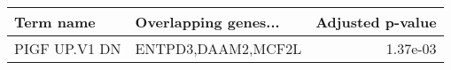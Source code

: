 \begin{tabular}{llr}
\toprule
    Term name & Overlapping genes... &  Adjusted p-value \\
\midrule
PIGF UP.V1 DN &   ENTPD3,DAAM2,MCF2L &          1.37e-03 \\
\bottomrule
\end{tabular}
